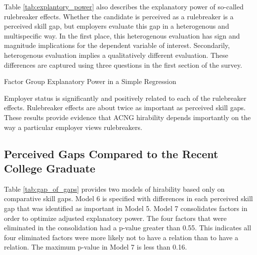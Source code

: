\documentclass[review]{elsarticle}
\begin{document}
Table \ref{tab:explantory_power} also describes the explanatory power of so-called rulebreaker effects.
Whether the candidate is perceived as a rulebreaker is a perceived skill gap, but employers evaluate this gap in a heterogenous and multispecific way.
In the first place, this heterogenous evaluation has sign and magnitude implications for the dependent variable of interest.
Secondarily, heterogenous evaluation implies a qualitatively different evaluation.
These differences are captured using three questions in the first section of the survey.

\begin{table}
    \caption{Factor Group Explanatory Power in a Simple Regression}
    \resizebox{\columnwidth}{!}{
        
    }
    \label{tab:explantory_power}
\end{table}

Employer status is significantly and positively related to each of the rulebreaker effects.
Rulebreaker effects are about twice as important as perceived skill gaps.
These results provide evidence that ACNG hirability depends importantly on the way a particular employer views rulebreakers.

\subsection{Perceived Gaps Compared to the Recent College Graduate}

Table \ref{tab:gap_of_gaps} provides two models of hirability based only on comparative skill gaps.
Model 6 is specified with differences in each perceived skill gap that was identified as important in Model 5.
Model 7 consolidates factors in order to optimize adjusted explanatory power.
The four factors that were eliminated in the consolidation had a p-value greater than 0.55.
This indicates all four eliminated factors were more likely not to have a relation than to have a relation.
The maximum p-value in Model 7 is less than 0.16.
\end{document}
